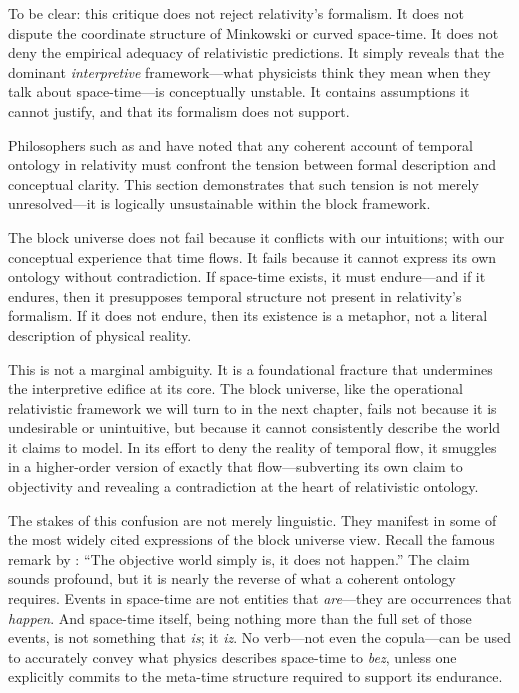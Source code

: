 \documentclass[12pt]{book}
\begin{document}
To be clear: this critique does not reject relativity's formalism. It does not dispute the coordinate structure of Minkowski or curved space-time. It does not deny the empirical adequacy of relativistic predictions. It simply reveals that the dominant \textit{interpretive} framework---what physicists think they mean when they talk about space-time---is conceptually unstable. It contains assumptions it cannot justify, and that its formalism does not support. 

Philosophers such as \citet{savitt2000} and \citet{dorato2011} have noted that any coherent account of temporal ontology in relativity must confront the tension between formal description and conceptual clarity. This section demonstrates that such tension is not merely unresolved---it is logically unsustainable within the block framework.

The block universe does not fail because it conflicts with our intuitions; with our conceptual experience that time flows. It fails because it cannot express its own ontology without contradiction. If space-time exists, it must endure---and if it endures, then it presupposes temporal structure not present in relativity's formalism. If it does not endure, then its existence is a metaphor, not a literal description of physical reality.

This is not a marginal ambiguity. It is a foundational fracture that undermines the interpretive edifice at its core. The block universe, like the operational relativistic framework we will turn to in the next chapter, fails not because it is undesirable or unintuitive, but because it cannot consistently describe the world it claims to model. In its effort to deny the reality of temporal flow, it smuggles in a higher-order version of exactly that flow---subverting its own claim to objectivity and revealing a contradiction at the heart of relativistic ontology.

The stakes of this confusion are not merely linguistic. They manifest in some of the most widely cited expressions of the block universe view. Recall the famous remark by \citet{weyl1949}: ``The objective world simply is, it does not happen.'' The claim sounds profound, but it is nearly the reverse of what a coherent ontology requires. Events in space-time are not entities that \textit{are}---they are occurrences that \textit{happen}. And space-time itself, being nothing more than the full set of those events, is not something that \textit{is}; it \textit{iz}. No verb---not even the copula---can be used to accurately convey what physics describes space-time to \textit{bez}, unless one explicitly commits to the meta-time structure required to support its endurance.
\end{document}

